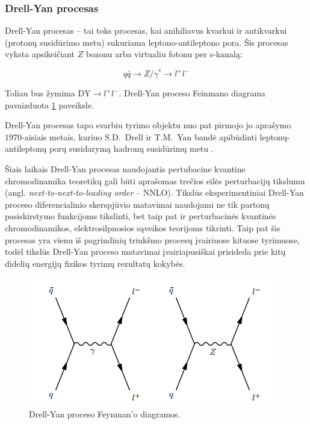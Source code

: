 \documentclass[a4paper, 12pt]{article}
\newcommand{\DY}{\mathrm{DY}}
\newlength\q
\begin{document}
\begin{centering}
\begin{minipage}[t]{0.48\linewidth}
\end{minipage}
\vspace{-0.3cm}
\end{centering}

\subsubsection{Drell-Yan procesas}
Drell-Yan procesas -- tai toks procesas, kai anihiliavus kvarkui ir antikvarkui (protonų susidūrimo
metu) sukuriama leptono-antileptono pora.
Šis procesas vyksta apsikeičiant $Z$ bozonu arba
virtualiu fotonu per s-kanalą:

\begin{equation*}
	q\bar{q} \rightarrow Z/ \gamma^{*} \rightarrow l^{+}l^{-}
\end{equation*}

Toliau bus žymima $\DY \! \rightarrow \! l^{+}l^{-}$. Drell-Yan proceso Feinmano diagrama
pavaizduota \ref{fig:DYfeyn} paveiksle.

Drell-Yan procesas tapo svarbiu tyrimo objektu nuo pat pirmojo jo aprašymo $1970$-aisiais
metais, kuriuo S.D.\ Drell ir T.M.\ Yan bandė apibūdinti leptonų-antileptonų porų susidarymą
hadronų susidūrimų metu \cite{DYoriginal}.

Šiais laikais Drell-Yan procesas naudojantis pertubacine kvantine chromodinamika teoretikų
gali būti aprašomas trečios eilės perturbacijų tikslumu (angl. \textit{next-to-next-to-leading
order} -- NNLO).
Tikslūs eksperimentiniai Drell-Yan proceso diferencialinio skerspjūvio matavimai naudojami
ne tik partonų pasiskirstymo funkcijoms tikslinti, bet taip pat ir perturbacinės kvantinės
chromodinamikos, elektrosilpnosios sąveikos teorijoms tikrinti. Taip pat šis procesas yra vienu iš
pagrindinių triukšmo procesų įvairiuose kituose tyrimuose, todėl tikslūs Drell-Yan proceso matavimai
įvairiapusiškai prisideda prie kitų didelių energijų fizikos tyrimų rezultatų kokybės.

\begin{figure}[H]
\centering
\includegraphics[scale=0.75]{DYprocess.PNG}
\caption{Drell-Yan proceso Feynman'o diagramos.}
\label{fig:DYfeyn}
\end{figure}
\end{document}
